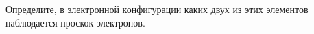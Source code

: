 Определите, в электронной конфигурации каких двух из этих элементов наблюдается проскок электронов.
